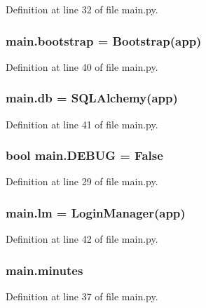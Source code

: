 Definition at line 32 of file main.\+py.

\subsubsection[{\texorpdfstring{bootstrap}{bootstrap}}]{\setlength{\rightskip}{0pt plus 5cm}main.\+bootstrap = Bootstrap({\bf app})}\hypertarget{namespacemain_a2799db3c64165e5659fada6c15d90aea}{}\label{namespacemain_a2799db3c64165e5659fada6c15d90aea}


Definition at line 40 of file main.\+py.

\subsubsection[{\texorpdfstring{db}{db}}]{\setlength{\rightskip}{0pt plus 5cm}main.\+db = S\+Q\+L\+Alchemy({\bf app})}\hypertarget{namespacemain_afadee2a30284fe18a4fee574c23c94e3}{}\label{namespacemain_afadee2a30284fe18a4fee574c23c94e3}


Definition at line 41 of file main.\+py.

\subsubsection[{\texorpdfstring{D\+E\+B\+UG}{DEBUG}}]{\setlength{\rightskip}{0pt plus 5cm}bool main.\+D\+E\+B\+UG = False}\hypertarget{namespacemain_ad2cce3c3d1036d38f161e4814c97e1b5}{}\label{namespacemain_ad2cce3c3d1036d38f161e4814c97e1b5}


Definition at line 29 of file main.\+py.

\subsubsection[{\texorpdfstring{lm}{lm}}]{\setlength{\rightskip}{0pt plus 5cm}main.\+lm = Login\+Manager({\bf app})}\hypertarget{namespacemain_aaf584fa2bbd608ba30fe2a84f4a6e604}{}\label{namespacemain_aaf584fa2bbd608ba30fe2a84f4a6e604}


Definition at line 42 of file main.\+py.

\subsubsection[{\texorpdfstring{minutes}{minutes}}]{\setlength{\rightskip}{0pt plus 5cm}main.\+minutes}\hypertarget{namespacemain_aad5fb0badb72b68b03eda5bc7e72f989}{}\label{namespacemain_aad5fb0badb72b68b03eda5bc7e72f989}


Definition at line 37 of file main.\+py.

